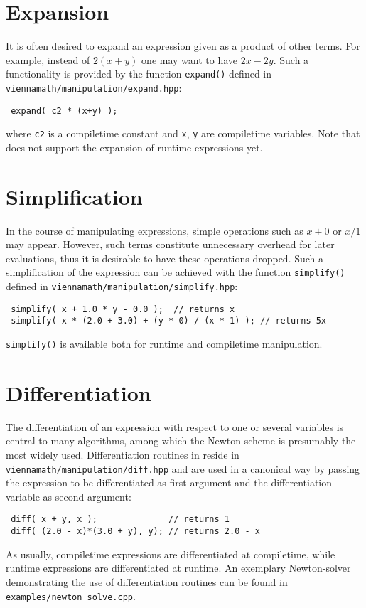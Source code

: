  \section{Expansion}
It is often desired to expand an expression given as a product of other terms. For example, instead of $2(x+y)$ one may want to have $2x - 2y$.
Such a functionality is provided by the function \lstinline|expand()| defined in \lstinline|viennamath/manipulation/expand.hpp|:
\begin{lstlisting}
 expand( c2 * (x+y) );
\end{lstlisting}
where \lstinline|c2| is a compiletime constant and \lstinline|x|, \lstinline|y| are compiletime variables.
Note that {\ViennaMathversion} does not support the expansion of runtime expressions yet.




 \section{Simplification}
In the course of manipulating expressions, simple operations such as $x+0$ or $x/1$ may appear.
However, such terms constitute unnecessary overhead for later evaluations, thus it is desirable to have these operations dropped.
Such a simplification of the expression can be achieved with the function \lstinline|simplify()| defined in \lstinline|viennamath/manipulation/simplify.hpp|:
\begin{lstlisting}
 simplify( x + 1.0 * y - 0.0 );  // returns x
 simplify( x * (2.0 + 3.0) + (y * 0) / (x * 1) ); // returns 5x
\end{lstlisting}
\lstinline|simplify()| is available both for runtime and compiletime manipulation.


 \section{Differentiation}
The differentiation of an expression with respect to one or several variables is central to many algorithms, among which the Newton scheme is presumably the
most widely used. Differentiation routines in {\ViennaMath} reside in \lstinline|viennamath/manipulation/diff.hpp| and are used in a canonical way by passing
the expression to be differentiated as first argument and the differentiation variable as second argument:
\begin{lstlisting}
 diff( x + y, x );              // returns 1
 diff( (2.0 - x)*(3.0 + y), y); // returns 2.0 - x
\end{lstlisting}
As usually, compiletime expressions are differentiated at compiletime, while runtime expressions are differentiated at runtime.
An exemplary Newton-solver demonstrating the use of differentiation routines can be found in \lstinline|examples/newton_solve.cpp|.


